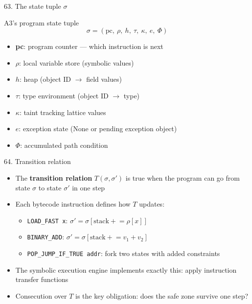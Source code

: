 \documentclass[aspectratio=169]{beamer}
\begin{document}
\begin{frame}{63. The state tuple $\sigma$}
\begin{block}{A3's program state tuple}
\[
\sigma = (\text{pc},\ \rho,\ h,\ \tau,\ \kappa,\ e,\ \Phi)
\]
\end{block}
\begin{itemize}
  \item \textbf{pc}: program counter --- which instruction is next
  \item \textbf{$\rho$}: local variable store (symbolic values)
  \item \textbf{$h$}: heap (object ID \(\to\) field values)
  \item \textbf{$\tau$}: type environment (object ID \(\to\) type)
  \item \textbf{$\kappa$}: taint tracking lattice values
  \item \textbf{$e$}: exception state (None or pending exception object)
  \item \textbf{$\Phi$}: accumulated path condition
\end{itemize}
\end{frame}

\begin{frame}{64. Transition relation}
\begin{itemize}
  \item The \textbf{transition relation} \(T(\sigma, \sigma')\) is true when the program can go from state \(\sigma\) to state \(\sigma'\) in one step
  \item Each bytecode instruction defines how \(T\) updates:
    \begin{itemize}
      \item \texttt{LOAD\_FAST x}: \(\sigma' = \sigma[\text{stack} \mathrel{+}= \rho[x]]\)
      \item \texttt{BINARY\_ADD}: \(\sigma' = \sigma[\text{stack} \mathrel{+}= v_1 + v_2]\)
      \item \texttt{POP\_JUMP\_IF\_TRUE addr}: fork two states with added constraints
    \end{itemize}
  \item The symbolic execution engine implements exactly this: apply instruction transfer functions
  \item Consecution over \(T\) is the key obligation: does the safe zone survive one step?
\end{itemize}
\end{frame}
\end{document}
